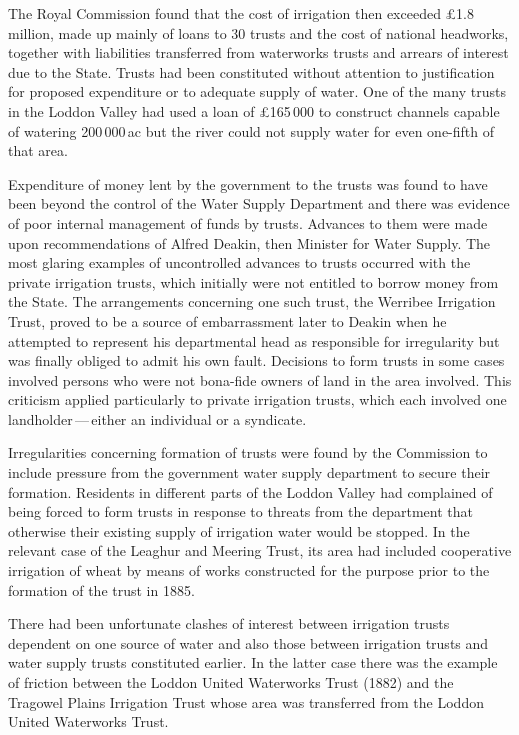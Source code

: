 The Royal Commission found that the cost of irrigation then exceeded
\pounds1.8 million, made up mainly of loans to 30 trusts and the cost of
national headworks, together with liabilities transferred from
waterworks trusts and arrears of interest due to the State.  Trusts
had been constituted without attention to justification for proposed
expenditure or to adequate supply of water.  One of the many trusts in
the Loddon Valley had used a loan of \pounds165\,000 to construct
channels capable of watering 200\,000\,ac but the river could not
supply water for even one-fifth of that area.

Expenditure of money lent by the government to the trusts was found to
have been beyond the control of the Water Supply Department and there
was evidence of poor internal management of funds by trusts.  Advances
to them were made upon recommendations of Alfred Deakin, then Minister
for Water Supply.  The most glaring examples of uncontrolled advances
to trusts occurred with the private irrigation trusts, which initially
were not entitled to borrow money from the State.  The arrangements
concerning one such trust, the Werribee Irrigation Trust, proved to be
a source of embarrassment later to Deakin when he attempted to
represent his departmental head as responsible for irregularity but
was finally obliged to admit his own fault.  Decisions to form trusts
in some cases involved persons who were not bona-fide owners of land
in the area involved.  This criticism applied particularly to private
irrigation trusts, which each involved one landholder\,---\,either an
individual or a syndicate.

Irregularities concerning formation of trusts were found by the
Commission to include pressure from the government water supply
department to secure their formation.  Residents in different parts of
the Loddon Valley had complained of being forced to form trusts in
response to threats from the department that otherwise their existing
supply of irrigation water would be stopped.  In the relevant case of
the Leaghur and Meering Trust, its area had included cooperative
irrigation of wheat by means of works constructed for the purpose
prior to the formation of the trust in 1885.

There had been unfortunate clashes of interest between irrigation
trusts dependent on one source of water and also those between
irrigation trusts and water supply trusts constituted earlier.  In the
latter case there was the example of friction between the Loddon
United Waterworks Trust (1882) and the Tragowel Plains Irrigation
Trust whose area was transferred from the Loddon United Waterworks
Trust.


